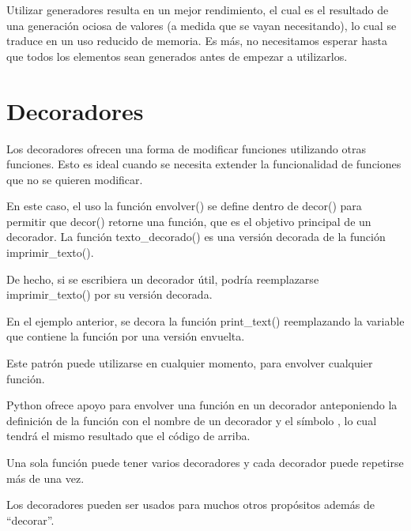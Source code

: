 \documentclass{report}
\newcommand{\doble}[1]{``#1''}
\begin{document}
{Utilizar generadores resulta en un mejor rendimiento, el cual es el resultado de una generación ociosa de valores (a medida que se vayan necesitando), lo cual se traduce en un uso reducido de memoria. Es más, no necesitamos esperar hasta que todos los elementos sean generados antes de empezar a utilizarlos.

\section{Decoradores}

Los decoradores ofrecen una forma de modificar funciones utilizando otras funciones. Esto es ideal cuando se necesita extender la funcionalidad de funciones que no se quieren modificar.


En este caso, el uso la función envolver() se define dentro de decor() para permitir que decor() retorne una función, que es el objetivo principal de un decorador. La función texto\_decorado() es una versión decorada de la función imprimir\_texto().

De hecho, si se escribiera un decorador útil, podría reemplazarse imprimir\_texto() por su versión decorada.


En el ejemplo anterior, se decora la función print\_text() reemplazando la variable que contiene la función por una versión envuelta.


Este patrón puede utilizarse en cualquier momento, para envolver cualquier función.

Python ofrece apoyo para envolver una función en un decorador anteponiendo la definición de la función con el nombre de un decorador y el símbolo \@, lo cual tendrá el mismo resultado que el código de arriba.


Una sola función puede tener varios decoradores y cada decorador puede repetirse más de una vez.


Los decoradores pueden ser usados para muchos otros propósitos además de \doble{decorar}.


}
\end{document}
